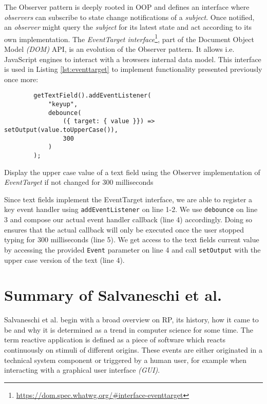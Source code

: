 \documentclass[12pt,a4paper]{article}
\begin{document}
The Observer pattern \cite{gamma1995design} is deeply rooted in OOP and defines an interface where \emph{observers} can subscribe to state change notifications of a \emph{subject}. Once notified, an \emph{observer} might query the \emph{subject} for its latest state and act according to its own implementation. The \emph{EventTarget interface}\footnote{\url{https://dom.spec.whatwg.org/\#interface-eventtarget}}, part of the Document Object Model \emph{(DOM)} API, is an evolution of the Observer pattern. It allows i.e. JavaScript engines to interact with a browsers internal data model. This interface is used in Listing \ref{lst:eventtarget} to implement functionality presented previously once more:

\begin{listing}[H]
	\begin{verbatim}
		getTextField().addEventListener(
			"keyup",
			debounce(
				({ target: { value }}) => setOutput(value.toUpperCase()),
				300
			)
		);
	\end{verbatim}
	\caption{Display the upper case value of a text field using the Observer implementation of \emph{EventTarget} if not changed for 300 milliseconds}
	\label{lst:eventtarget}
\end{listing}

Since text fields implement the EventTarget interface, we are able to register a key event handler using \texttt{addEventListener} on line 1-2. We use \texttt{debounce} on line 3 and compose our actual event handler callback (line 4) accordingly. Doing so ensures that the actual callback will only be executed once the user stopped typing for 300 milliseconds (line 5). We get access to the text fields current value by accessing the provided \texttt{Event} parameter on line 4 and call \texttt{setOutput} with the upper case version of the text (line 4).

\section{Summary of Salvaneschi et al.}
\label{sec:summary}

Salvaneschi et al. \cite{7827078} begin with a broad overview on RP, its history, how it came to be and why it is determined as a trend in computer science for some time. The term reactive application is defined as a piece of software which reacts continuously on stimuli of different origins. These events are either originated in a technical system component or triggered by a human user, for example when interacting with a graphical user interface \emph{(GUI)}.
\end{document}
